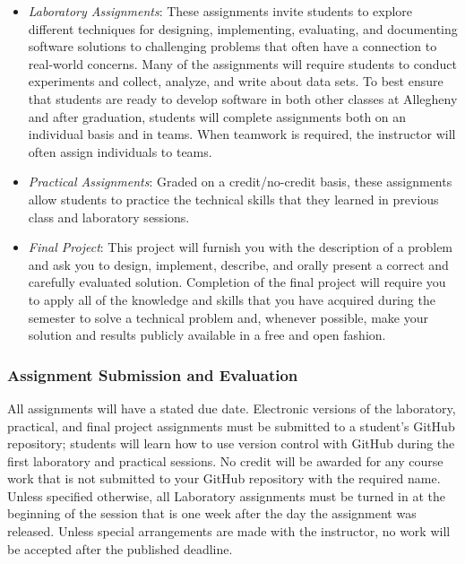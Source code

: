 \documentclass[11pt]{article}
\begin{document}
\begin{itemize}
  \item {\em Laboratory Assignments\/}: These assignments invite students to
    explore different techniques for designing, implementing, evaluating, and
    documenting software solutions to challenging problems that often have a
    connection to real-world concerns. Many of the assignments will require
    students to conduct experiments and collect, analyze, and write about data
    sets. To best ensure that students are ready to develop software in both
    other classes at Allegheny and after graduation, students will complete
    assignments both on an individual basis and in teams. When teamwork is
    required, the instructor will often assign individuals to teams.

  \item {\em Practical Assignments\/}: Graded on a credit/no-credit basis, these
    assignments allow students to practice the technical skills that they
    learned in previous class and laboratory sessions.

  \item {\em Final Project\/}: This project will furnish you with the
    description of a problem and ask you to design, implement, describe, and
    orally present a correct and carefully evaluated solution. Completion of the
    final project will require you to apply all of the knowledge and skills that
    you have acquired during the semester to solve a technical problem and,
    whenever possible, make your solution and results publicly available in a
    free and open fashion.

\end{itemize}

\subsubsection*{Assignment Submission and Evaluation}

All assignments will have a stated due date. Electronic versions of the
laboratory, practical, and final project assignments must be submitted to a
student's GitHub repository; students will learn how to use version control with
GitHub during the first laboratory and practical sessions. No credit will be
awarded for any course work that is not submitted to your GitHub repository with
the required name. Unless specified otherwise, all Laboratory assignments must
be turned in at the beginning of the session that is one week after the day the
assignment was released. Unless special arrangements are made with the
instructor, no work will be accepted after the published deadline.
\end{document}
